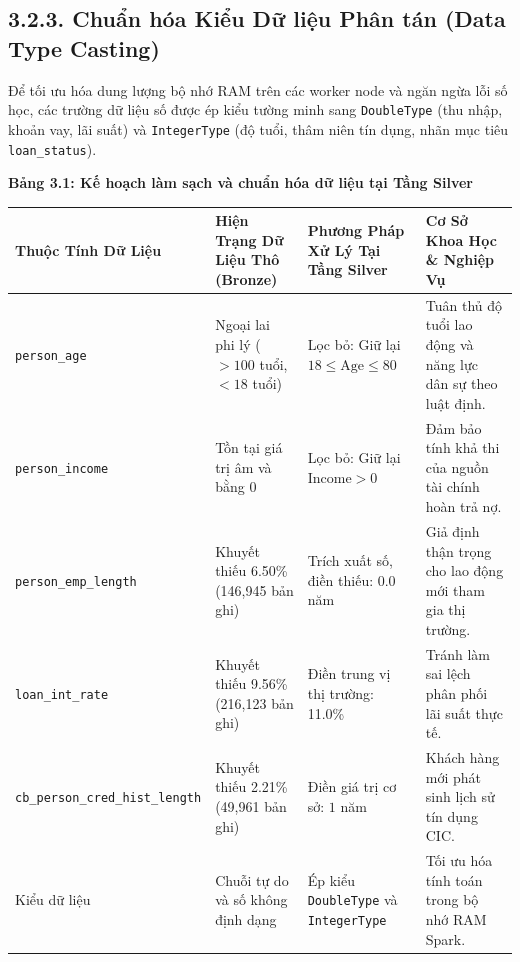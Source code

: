 \documentclass[
  13pt,
  a4paper,
]{report}
\newcounter{none} %
\begin{document}
\subsection{3.2.3. Chuẩn hóa Kiểu Dữ liệu Phân tán (Data Type
Casting)}\label{chuux1ea9n-huxf3a-kiux1ec3u-dux1eef-liux1ec7u-phuxe2n-tuxe1n-data-type-casting}

Để tối ưu hóa dung lượng bộ nhớ RAM trên các worker node và ngăn ngừa
lỗi số học, các trường dữ liệu số được ép kiểu tường minh sang
\texttt{DoubleType} (thu nhập, khoản vay, lãi suất) và
\texttt{IntegerType} (độ tuổi, thâm niên tín dụng, nhãn mục tiêu
\texttt{loan\_status}).

\textbf{Bảng 3.1: Kế hoạch làm sạch và chuẩn hóa dữ liệu tại Tầng
Silver}

{\def\LTcaptype{none} %
\begin{longtable}[]{@{}
  >{\raggedright\arraybackslash}p{}
  >{\raggedright\arraybackslash}p{}
  >{\raggedright\arraybackslash}p{}
  >{\raggedright\arraybackslash}p{}@{}}
\toprule\noalign{}
\begin{minipage}[b]{\linewidth}\raggedright
Thuộc Tính Dữ Liệu
\end{minipage} & \begin{minipage}[b]{\linewidth}\raggedright
Hiện Trạng Dữ Liệu Thô (Bronze)
\end{minipage} & \begin{minipage}[b]{\linewidth}\raggedright
Phương Pháp Xử Lý Tại Tầng Silver
\end{minipage} & \begin{minipage}[b]{\linewidth}\raggedright
Cơ Sở Khoa Học \& Nghiệp Vụ
\end{minipage} \\
\midrule\noalign{}
\endhead
\bottomrule\noalign{}
\endlastfoot
\texttt{person\_age} & Ngoại lai phi lý (\(>100\) tuổi, \(<18\) tuổi) &
Lọc bỏ: Giữ lại \(18 \le \text{Age} \le 80\) & Tuân thủ độ tuổi lao động
và năng lực dân sự theo luật định. \\
\texttt{person\_income} & Tồn tại giá trị âm và bằng \(0\) & Lọc bỏ: Giữ
lại \(\text{Income} > 0\) & Đảm bảo tính khả thi của nguồn tài chính
hoàn trả nợ. \\
\texttt{person\_emp\_length} & Khuyết thiếu 6.50\% (146,945 bản ghi) &
Trích xuất số, điền thiếu: \(0.0\) năm & Giả định thận trọng cho lao
động mới tham gia thị trường. \\
\texttt{loan\_int\_rate} & Khuyết thiếu 9.56\% (216,123 bản ghi) & Điền
trung vị thị trường: 11.0\% & Tránh làm sai lệch phân phối lãi suất thực
tế. \\
\texttt{cb\_person\_cred\_hist\_length} & Khuyết thiếu 2.21\% (49,961
bản ghi) & Điền giá trị cơ sở: \(1\) năm & Khách hàng mới phát sinh lịch
sử tín dụng CIC. \\
Kiểu dữ liệu & Chuỗi tự do và số không định dạng & Ép kiểu
\texttt{DoubleType} và \texttt{IntegerType} & Tối ưu hóa tính toán trong
bộ nhớ RAM Spark. \\
\end{longtable}
}
\end{document}
